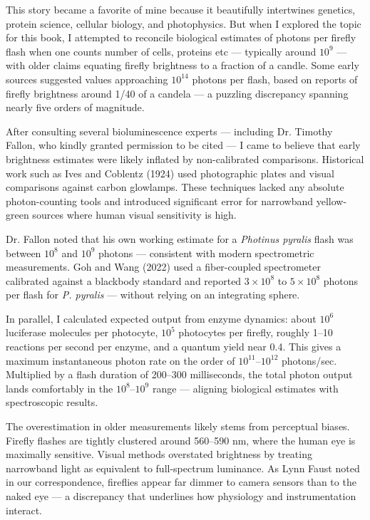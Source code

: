 \begin{commentary}
This story became a favorite of mine because it beautifully intertwines genetics, protein science, cellular biology, and photophysics. But when I explored the topic for this book, I attempted to reconcile biological estimates of photons per firefly flash when one counts number of cells, proteins etc — typically around $10^9$ — with older claims equating firefly brightness to a fraction of a candle. Some early sources suggested values approaching $10^{14}$ photons per flash, based on reports of firefly brightness around 1/40 of a candela — a puzzling discrepancy spanning nearly five orders of magnitude.

After consulting several bioluminescence experts — including Dr. Timothy Fallon, who kindly granted permission to be cited — I came to believe that early brightness estimates were likely inflated by non-calibrated comparisons. Historical work such as Ives and Coblentz (1924) used photographic plates and visual comparisons against carbon glowlamps. These techniques lacked any absolute photon-counting tools and introduced significant error for narrowband yellow-green sources where human visual sensitivity is high.

Dr. Fallon noted that his own working estimate for a \textit{Photinus pyralis} flash was between $10^8$ and $10^9$ photons — consistent with modern spectrometric measurements. Goh and Wang (2022) used a fiber-coupled spectrometer calibrated against a blackbody standard and reported $3 \times 10^8$ to $5 \times 10^8$ photons per flash for \textit{P. pyralis} — without relying on an integrating sphere.

In parallel, I calculated expected output from enzyme dynamics: about $10^6$ luciferase molecules per photocyte, $10^5$ photocytes per firefly, roughly 1–10 reactions per second per enzyme, and a quantum yield near 0.4. This gives a maximum instantaneous photon rate on the order of $10^{11}$–$10^{12}$ photons/sec. Multiplied by a flash duration of 200–300 milliseconds, the total photon output lands comfortably in the $10^8$–$10^9$ range — aligning biological estimates with spectroscopic results.

The overestimation in older measurements likely stems from perceptual biases. Firefly flashes are tightly clustered around 560–590 nm, where the human eye is maximally sensitive. Visual methods overstated brightness by treating narrowband light as equivalent to full-spectrum luminance. As Lynn Faust noted in our correspondence, fireflies appear far dimmer to camera sensors than to the naked eye — a discrepancy that underlines how physiology and instrumentation interact.


\end{commentary}
